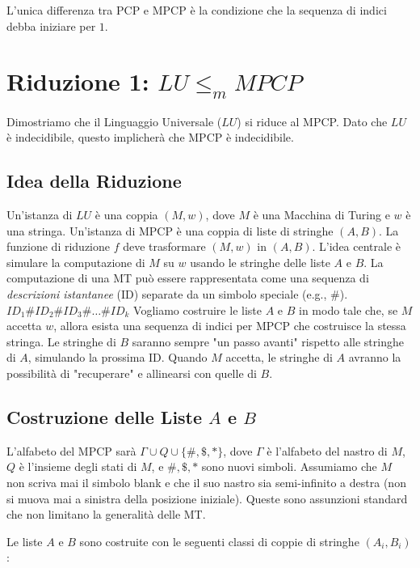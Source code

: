 \documentclass[a4paper, 11pt]{book} %
\theoremstyle{definition}
\begin{document}
L'unica differenza tra PCP e MPCP è la condizione che la sequenza di indici debba iniziare per $1$.

\section{Riduzione 1: $LU \le_m MPCP$}

Dimostriamo che il Linguaggio Universale ($LU$) si riduce al MPCP. Dato che $LU$ è indecidibile, questo implicherà che MPCP è indecidibile.

\subsection{Idea della Riduzione}
Un'istanza di $LU$ è una coppia $(M, w)$, dove $M$ è una Macchina di Turing e $w$ è una stringa.
Un'istanza di MPCP è una coppia di liste di stringhe $(A, B)$.
La funzione di riduzione $f$ deve trasformare $(M, w)$ in $(A, B)$.
L'idea centrale è simulare la computazione di $M$ su $w$ usando le stringhe delle liste $A$ e $B$. La computazione di una MT può essere rappresentata come una sequenza di \emph{descrizioni istantanee} (ID) separate da un simbolo speciale (e.g., $\#$).
$ID_1 \# ID_2 \# ID_3 \# \dots \# ID_k$
Vogliamo costruire le liste $A$ e $B$ in modo tale che, se $M$ accetta $w$, allora esista una sequenza di indici per MPCP che costruisce la stessa stringa.
Le stringhe di $B$ saranno sempre "un passo avanti" rispetto alle stringhe di $A$, simulando la prossima ID. Quando $M$ accetta, le stringhe di $A$ avranno la possibilità di "recuperare" e allinearsi con quelle di $B$.

\subsection{Costruzione delle Liste $A$ e $B$}
L'alfabeto del MPCP sarà $\Gamma \cup Q \cup \{\#, \$, *\}$, dove $\Gamma$ è l'alfabeto del nastro di $M$, $Q$ è l'insieme degli stati di $M$, e $\#, \$, *$ sono nuovi simboli.
Assumiamo che $M$ non scriva mai il simbolo blank e che il suo nastro sia semi-infinito a destra (non si muova mai a sinistra della posizione iniziale). Queste sono assunzioni standard che non limitano la generalità delle MT.

Le liste $A$ e $B$ sono costruite con le seguenti classi di coppie di stringhe $(A_i, B_i)$:
\end{document}
